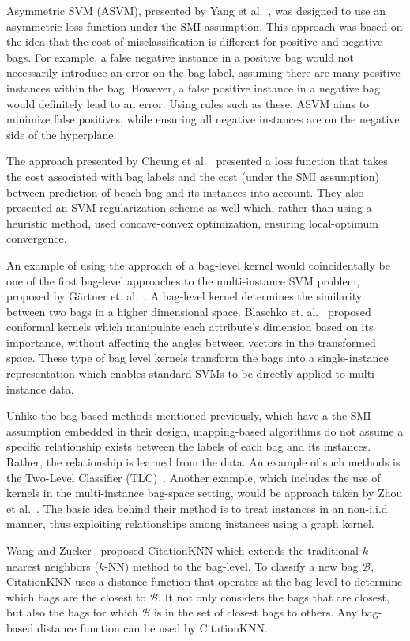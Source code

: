 \documentclass[reqno]{vcuthesis}
\numberwithin{equation}{chapter}
\begin{document}
Asymmetric SVM (ASVM), presented by Yang et al.~\cite{Herman2008}, was designed to use an asymmetric loss function under the SMI assumption. This approach was based on the idea that the cost of misclassification is different for positive and negative bags. For example, a false negative instance in a positive bag would not necessarily introduce an error on the bag label, assuming there are many positive instances within the bag. However, a false positive instance in a negative bag would definitely lead to an error. Using rules such as these, ASVM aims to minimize false positives, while ensuring all negative instances are on the negative side of the hyperplane.

The approach presented by Cheung et al.~\cite{cheung2006regularization} presented a loss function that takes the cost associated with bag labels and the cost (under the SMI assumption) between prediction of beach bag and its instances into account. They also presented an SVM regularization scheme as well which, rather than using a heuristic method, used concave-convex optimization, ensuring local-optimum convergence.

An example of using the approach of a bag-level kernel would coincidentally be one of the first bag-level approaches to the multi-instance SVM problem, proposed by G{\"a}rtner et. al.~\cite{Smola2002}. A bag-level kernel determines the similarity between two bags in a higher dimensional space. Blaschko et. al.~\cite{Blaschko2006} proposed conformal kernels which manipulate each attribute's dimension based on its importance, without affecting the angles between vectors in the transformed space. These type of bag level kernels transform the bags into a single-instance representation which enables standard SVMs to be directly applied to multi-instance data. 

Unlike the bag-based methods mentioned previously, which have a the SMI assumption embedded in their design, mapping-based algorithms do not assume a specific relationship exists between the labels of each bag and its instances. Rather, the relationship is learned from the data. An example of such methods is the Two-Level Classifier (TLC)~\cite{Weidmann2003}. Another example, which includes the use of kernels in the multi-instance bag-space setting, would be approach taken by Zhou et al.~\cite{zhou2009multi}. The basic idea behind their method is to treat instances in an non-i.i.d. manner, thus exploiting relationships among instances using a graph kernel. 

Wang and Zucker~\cite{wang2000solving} proposed CitationKNN which extends the traditional $k$-nearest neighbors ($k$-NN) method to the bag-level. To classify a new bag $\mathcal{B}$, CitationKNN uses a distance function that operates at the bag level to determine which bags are the closest to $\mathcal{B}$. It not only considers the bags that are closest, but also the bags for which $\mathcal{B}$ is in the set of closest bags to others. Any bag-based distance function can be used by CitationKNN.
\end{document}
